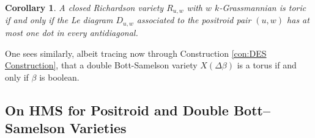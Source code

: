 \documentclass[11pt]{amsart}
\newtheorem{cor}[thm]{Corollary}
\newtheorem{prop}[thm]{Proposition}
\theoremstyle{definition}
\newtheorem{rem}[thm]{Remark}
\theoremstyle{remark}
\numberwithin{equation}{section}
\begin{document}
\begin{cor}
    A closed Richardson variety $R_{u,w}$ with $w$ $k$-Grassmannian is toric if and only if the Le diagram $D_{u,w}$ associated to the positroid pair $(u, w)$ has at most one dot in every antidiagonal.
\end{cor}

One sees similarly, albeit tracing now through Construction \ref{con:DES Construction}, that a double Bott-Samelson variety $X(\Delta \beta)$ is a torus if and only if $\beta$ is boolean.






\subsection{On HMS for Positroid and Double Bott--Samelson Varieties}
\end{document}
